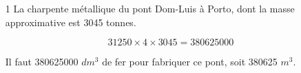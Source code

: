 \begin{enumerate}
	\item[1] La charpente métallique du pont Dom-Luis à Porto, dont la masse approximative est \num{3045} tonnes.
	\begin{solution}
		\begin{equation}
			\num{31250} \times 4 \times \num{3045} = \num{380625000}
		\end{equation}
		
		Il faut \num{380625000} $dm^3$ de fer pour fabriquer ce pont, soit \num{380625} $m^3$.
	\end{solution}
	
	
	
\end{enumerate}